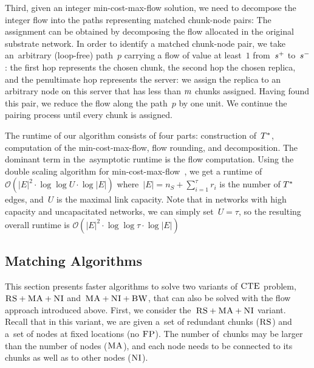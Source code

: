 Third, given an integer min-cost-max-flow solution, we need to decompose
the integer flow into the paths
representing matched chunk-node pairs:
The assignment can be obtained by decomposing the flow allocated in the
original substrate network. In order to identify a matched chunk-node pair,
we take an~arbitrary (loop-free) path~$p$ carrying a flow of value at least~$1$ from~$s^{+}$ to~$s^{-}$:
the first hop represents the chosen chunk, the second hop the chosen
replica, and the penultimate hop represents the server: we assign
the replica to an arbitrary node on this server that has less than $m$ chunks assigned.
Having found this pair, we reduce the flow
along the path~$p$ by one unit.
We continue the pairing process until every chunk is assigned.

The runtime of our algorithm consists of four parts: construction of~$T^*$,
computation of the min-cost-max-flow, flow rounding, and decomposition. The
dominant term in the~asymptotic runtime is the flow computation.
Using the double scaling algorithm for min-cost-max-flow~\cite{mincostmaxflow-state}, we get a runtime of~$\mathcal{O}(|E|^2 \cdot\log\log U \cdot \log |E|)$
where~$|E| = n_S+\sum_{i=1}^\tau r_i$ is the number of $T^*$ edges, and~$U$ is the maximal link capacity. Note that in networks with high capacity
and uncapacitated networks, we can simply set~$U=\tau$, so the resulting overall runtime is $\mathcal{O}(|E|^2 \cdot\log\log \tau \cdot \log |E|)$


\subsection{Matching Algorithms}\label{ssec:match}


This section presents faster algorithms to solve 
two variants of $\textsc{CTE}$ problem, $\textsc{RS}+\textsc{MA}+\textsc{NI}$ and~$\textsc{MA}+\textsc{NI}+\textsc{BW}$, that can also be solved with the flow approach
introduced above.
First, we consider the~$\textsc{RS}+\textsc{MA}+\textsc{NI}$ variant.
Recall that in this variant,
we are given a~set of redundant chunks ($\textsc{RS}$) and a~set of nodes
at fixed locations (no $\textsc{FP}$). The number of~chunks may be larger than the number
of nodes ($\textsc{MA}$), and each node needs to be connected
to its chunks as well as to other nodes ($\textsc{NI}$).

